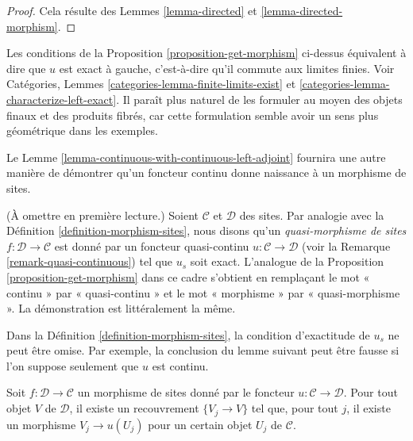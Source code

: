 \begin{proof}
Cela résulte des Lemmes \ref{lemma-directed} et
\ref{lemma-directed-morphism}.
\end{proof}

\begin{remark}
\label{remark-explain-left-exact}
Les conditions de la Proposition \ref{proposition-get-morphism} ci-dessus
équivalent à dire que $u$ est exact à gauche, c’est-à-dire qu’il commute
aux limites finies. Voir
Catégories, Lemmes
\ref{categories-lemma-finite-limits-exist} et
\ref{categories-lemma-characterize-left-exact}.
Il paraît plus naturel de les formuler au moyen des objets finaux
et des produits fibrés, car cette formulation semble avoir un sens plus géométrique
dans les exemples.
\end{remark}

\noindent
Le Lemme \ref{lemma-continuous-with-continuous-left-adjoint}
fournira une autre manière de démontrer qu’un foncteur continu
donne naissance à un morphisme de sites.

\begin{remark}
\label{remark-quasi-continuous-morphism-sites}
(À omettre en première lecture.)
Soient $\mathcal{C}$ et $\mathcal{D}$ des sites. Par analogie avec la
Définition \ref{definition-morphism-sites}, nous disons qu’un
{\it quasi-morphisme de sites $f : \mathcal{D} \to \mathcal{C}$}
est donné par un foncteur quasi-continu $u : \mathcal{C} \to \mathcal{D}$
(voir la Remarque \ref{remark-quasi-continuous}) tel que $u_s$ soit exact.
L’analogue de la Proposition \ref{proposition-get-morphism} dans ce
cadre s’obtient en remplaçant le mot « continu »
par « quasi-continu » et le mot
« morphisme » par « quasi-morphisme ». La démonstration est littéralement
la même.
\end{remark}

\noindent
Dans la Définition \ref{definition-morphism-sites}, la condition d’exactitude de
$u_s$ ne peut être omise. Par exemple, la conclusion du lemme suivant
peut être fausse si l’on suppose seulement que $u$ est continu.

\begin{lemma}
\label{lemma-morphism-of-sites-covering}
Soit $f : \mathcal{D} \to \mathcal{C}$ un morphisme de sites donné par le
foncteur $u : \mathcal{C} \to \mathcal{D}$. Pour tout objet $V$ de
$\mathcal{D}$, il existe un recouvrement $\{V_j \to V\}$ tel que, pour tout
$j$, il existe un morphisme $V_j \to u(U_j)$ pour un certain objet $U_j$
de $\mathcal{C}$.
\end{lemma}

